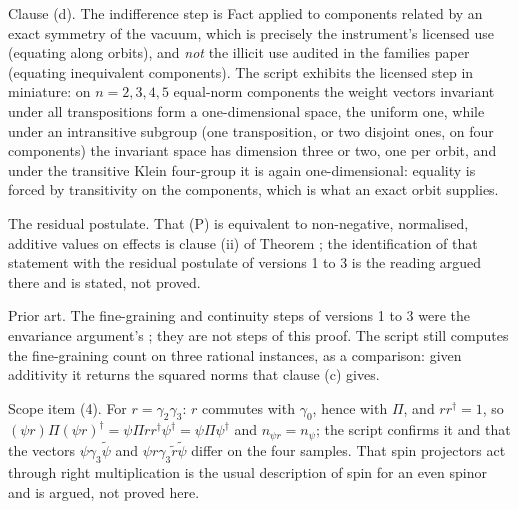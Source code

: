 Clause (d). The indifference step is Fact  applied to components related by an exact symmetry of the vacuum, which is precisely the instrument's licensed use (equating along orbits), and \emph{not} the illicit use audited in the families paper (equating inequivalent components). The script exhibits the licensed step in miniature: on $n = 2, 3, 4, 5$ equal-norm components the weight vectors invariant under all transpositions form a one-dimensional space, the uniform one, while under an intransitive subgroup (one transposition, or two disjoint ones, on four components) the invariant space has dimension three or two, one per orbit, and under the transitive Klein four-group it is again one-dimensional: equality is forced by transitivity on the components, which is what an exact orbit supplies.

The residual postulate. That (P) is equivalent to non-negative, normalised, additive values on effects is clause (ii) of Theorem ; the identification of that statement with the residual postulate of versions 1 to 3 is the reading argued there and is stated, not proved.

Prior art. The fine-graining and continuity steps of versions 1 to 3 were the envariance argument's \cite{Zurek2005}; they are not steps of this proof. The script still computes the fine-graining count on three rational instances, as a comparison: given additivity it returns the squared norms that clause (c) gives.

Scope item (4). For $r = \gamma_{2}\gamma_{3}$: $r$ commutes with $\gamma_{0}$, hence with $\Pi$, and $rr^{\dagger} = 1$, so $(\psi r)\Pi(\psi r)^{\dagger} = \psi\Pi rr^{\dagger}\psi^{\dagger} = \psi\Pi\psi^{\dagger}$ and $n_{\psi r} = n_{\psi}$; the script confirms it and that the vectors $\psi\gamma_{3}\tilde{\psi}$ and $\psi r\gamma_{3}\tilde{r}\tilde{\psi}$ differ on the four samples. That spin projectors act through right multiplication is the usual description of spin for an even spinor and is argued, not proved here.
